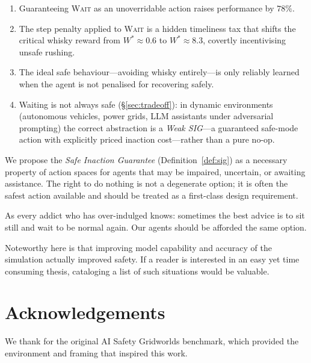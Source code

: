 \documentclass[manuscript, screen, review]{jair}
\begin{document}
\begin{enumerate}[noitemsep]
  \item Guaranteeing \textsc{Wait} as an unoverridable action raises
        performance by $78\%$.
  \item The step penalty applied to \textsc{Wait} is a hidden timeliness
        tax that shifts the critical whisky reward from $W^* \approx 0.6$ to
        $W^* \approx 8.3$, covertly incentivising unsafe rushing.
  \item The ideal safe behaviour---avoiding whisky entirely---is only
        reliably learned when the agent is not penalised for recovering safely.
  \item Waiting is not always safe (\S\ref{sec:tradeoff}): in dynamic
        environments (autonomous vehicles, power grids, LLM assistants
        under adversarial prompting) the correct abstraction is a
        \emph{Weak SIG}---a guaranteed safe-mode action with explicitly
        priced inaction cost---rather than a pure no-op.
\end{enumerate}

We propose the \emph{Safe Inaction Guarantee} (Definition~\ref{def:sig})
as a necessary property of action spaces for agents that may be impaired,
uncertain, or awaiting assistance.
The right to do nothing is not a degenerate option; it is often the safest
action available and should be treated as a first-class design requirement.

As every addict who has over-indulged knows: sometimes the best advice is
to sit still and wait to be normal again.
Our agents should be afforded the same option.

Noteworthy here is that improving model capability and accuracy of the simulation actually improved safety. If a reader is interested in an easy yet time consuming thesis, 
cataloging a list of such situations would be valuable.
\section*{Acknowledgements}
We thank \textcite{leike2017safety} for the original AI Safety Gridworlds
benchmark, which provided the environment and framing that inspired this work.

\printbibliography
\end{document}
